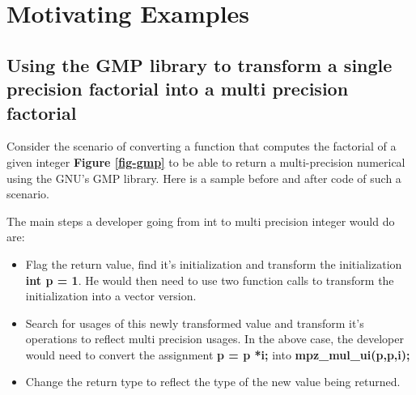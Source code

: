 \documentclass[preprint]{sigplanconf}
\begin{document}
\section{Motivating Examples}
\subsection{Using the GMP library to transform a single precision factorial into a multi precision factorial}
Consider the scenario of converting a function that computes the factorial of a given integer \textbf{Figure \ref{fig-gmp}} to be able to return a multi-precision numerical using the GNU's GMP library. Here is a sample before and after code of such a scenario.
\begin{figure*}
\caption{Integer to BigInteger conversion using GMP}
\label{fig-gmp}
\end{figure*}
The main steps a developer going from int to multi precision integer would do are:
\begin{itemize}
\item Flag the return value, find it's initialization and transform the initialization \textbf{int p = 1}. He would then need to use two function calls to transform the initialization into a vector version.
\item Search for usages of this newly transformed value and transform it's operations to reflect multi precision usages. In the above case, the developer would need to convert the assignment \textbf{p = p *i;}  into \textbf{mpz\_mul\_ui(p,p,i);} 
\item Change the return type to reflect the type of the new value being returned.
\end{itemize}
\end{document}
